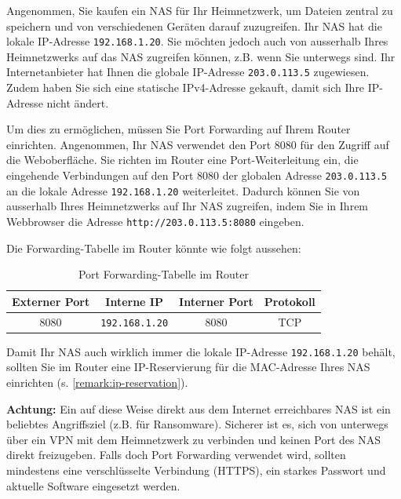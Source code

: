 \begin{myexample}
	Angenommen, Sie kaufen ein \gls{NAS} für Ihr Heimnetzwerk, um Dateien zentral zu speichern und von verschiedenen Geräten darauf zuzugreifen. Ihr \gls{NAS} hat die lokale \gls{IP}-Adresse \texttt{192.168.1.20}. Sie möchten jedoch auch von ausserhalb Ihres Heimnetzwerks auf das \gls{NAS} zugreifen können, z.B. wenn Sie unterwegs sind. Ihr Internetanbieter hat Ihnen die globale \gls{IP}-Adresse \texttt{203.0.113.5} zugewiesen. Zudem haben Sie sich eine statische \gls{IP}v4-Adresse gekauft, damit sich Ihre \gls{IP}-Adresse nicht ändert.

	Um dies zu ermöglichen, müssen Sie Port Forwarding auf Ihrem Router einrichten. Angenommen, Ihr \gls{NAS} verwendet den Port 8080 für den Zugriff auf die Weboberfläche. Sie richten im Router eine Port-Weiterleitung ein, die eingehende Verbindungen auf den Port 8080 der globalen Adresse \texttt{203.0.113.5} an die lokale Adresse \texttt{192.168.1.20} weiterleitet. Dadurch können Sie von ausserhalb Ihres Heimnetzwerks auf Ihr \gls{NAS} zugreifen, indem Sie in Ihrem Webbrowser die Adresse \texttt{http://203.0.113.5:8080} eingeben.

	Die Forwarding-Tabelle im Router könnte wie folgt aussehen:
	\begin{table}[H]
		\centering
		\begin{tabular}{cccc}
			\textbf{Externer Port} & \textbf{Interne \acrshort{IP}} & \textbf{Interner Port} & \textbf{Protokoll} \\
			\midrule
			8080 & \texttt{192.168.1.20} & 8080 & \gls{TCP} \\
		\end{tabular}
		\caption{Port Forwarding-Tabelle im Router}
	\end{table}

	Damit Ihr \gls{NAS} auch wirklich immer die lokale \gls{IP}-Adresse \texttt{192.168.1.20} behält, sollten Sie im Router eine \gls{IP}-Reservierung für die \gls{MAC}-Adresse Ihres \gls{NAS} einrichten (s. \cref{remark:ip-reservation}).

	\textbf{Achtung:} Ein auf diese Weise direkt aus dem Internet erreichbares \gls{NAS} ist ein beliebtes Angriffsziel (z.B. für Ransomware). Sicherer ist es, sich von unterwegs über ein \gls{VPN} mit dem Heimnetzwerk zu verbinden und keinen Port des \gls{NAS} direkt freizugeben. Falls doch Port Forwarding verwendet wird, sollten mindestens eine verschlüsselte Verbindung (\gls{HTTPS}), ein starkes Passwort und aktuelle Software eingesetzt werden.
\end{myexample}


